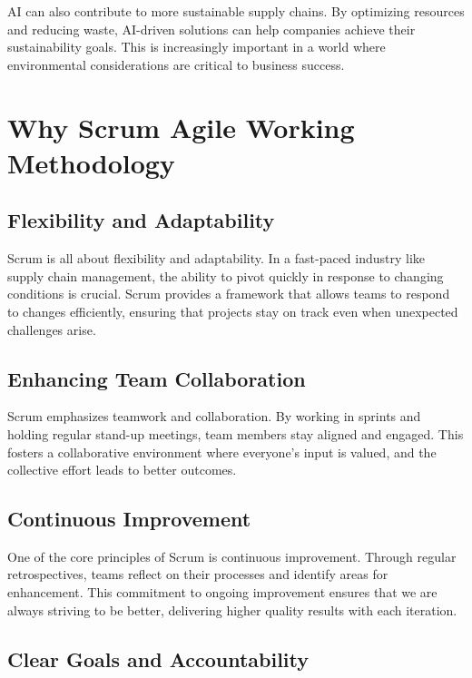 \documentclass[
  letterpaper,
  DIV=11,
  numbers=noendperiod]{scrreprt}
\begin{document}
AI can also contribute to more sustainable supply chains. By optimizing
resources and reducing waste, AI-driven solutions can help companies
achieve their sustainability goals. This is increasingly important in a
world where environmental considerations are critical to business
success.

\section{Why Scrum Agile Working
Methodology}\label{why-scrum-agile-working-methodology}

\subsection{Flexibility and
Adaptability}\label{flexibility-and-adaptability}

Scrum is all about flexibility and adaptability. In a fast-paced
industry like supply chain management, the ability to pivot quickly in
response to changing conditions is crucial. Scrum provides a framework
that allows teams to respond to changes efficiently, ensuring that
projects stay on track even when unexpected challenges arise.

\subsection{Enhancing Team
Collaboration}\label{enhancing-team-collaboration}

Scrum emphasizes teamwork and collaboration. By working in sprints and
holding regular stand-up meetings, team members stay aligned and
engaged. This fosters a collaborative environment where everyone's input
is valued, and the collective effort leads to better outcomes.

\subsection{Continuous Improvement}\label{continuous-improvement}

One of the core principles of Scrum is continuous improvement. Through
regular retrospectives, teams reflect on their processes and identify
areas for enhancement. This commitment to ongoing improvement ensures
that we are always striving to be better, delivering higher quality
results with each iteration.

\subsection{Clear Goals and
Accountability}\label{clear-goals-and-accountability}
\end{document}
